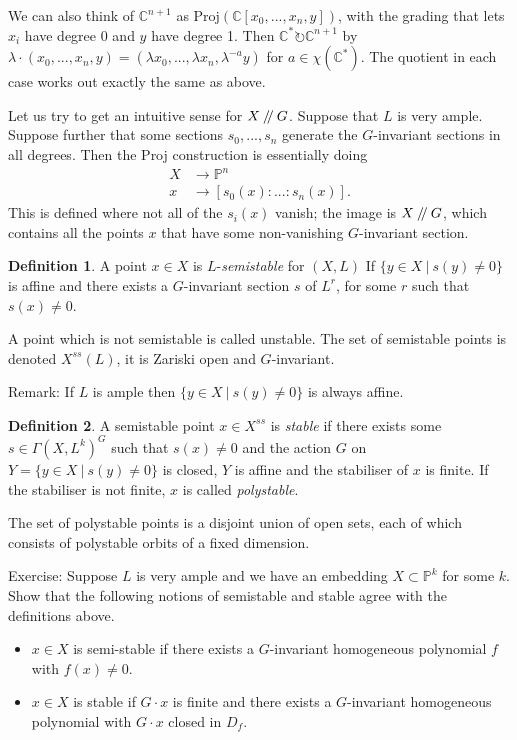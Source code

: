 \documentclass{article}
\theoremstyle{definition}
\newtheorem{defn}{Definition}
\newcommand{\C}{\mathbb{C}}
\newcommand{\bP}{\mathbb{P}}
\newcommand{\sslash}{\mathbin{/\mkern-4mu/}}
\newcommand{\Proj}{\text{Proj}}
\begin{document}
	We can also think of $\C^{n+1}$ as $\Proj\left(\C[x_0,...,x_n,y]\right)$, with the grading that lets $x_i$ have degree 0 and $y$ have degree 1. Then $\C^\ast \circlearrowright \C^{n+1}$ by $\lambda\cdot (x_0,...,x_n,y) = (\lambda x_0,...,\lambda x_n, \lambda^{-a}y)$ for $a\in \chi(\C^\ast)$. The quotient in each case works out exactly the same as above. \vspace{1em}
	
	Let us try to get an intuitive sense for $X\sslash G$. Suppose that $L$ is very ample. Suppose further that some sections $s_0,...,s_n$ generate the $G$-invariant sections in all degrees. Then the Proj construction is essentially doing
	\begin{align*}
		X &\to \bP^n\\
		x&\to [s_0(x):...:s_n(x)].
	\end{align*}
	This is defined where not all of the $s_i(x)$ vanish; the image is $X\sslash G$, which contains all the points $x$ that have some non-vanishing $G$-invariant section.
	
	\begin{defn}
		A point $x\in X$ is $L$-\emph{semistable} for $(X,L)$ If $\{y\in X ~|~ s(y)\neq 0\}$ is affine and there exists a $G$-invariant section $s$ of $L^r$, for some $r$ such that $s(x)\neq0$. \vspace{1em}
		
		A point which is not semistable is called unstable. The set of semistable points is denoted $X^{ss}(L)$, it is Zariski open and $G$-invariant.
	\end{defn}
	Remark: If $L$ is ample then $\{y\in X ~|~ s(y)\neq 0\}$ is always affine. \vspace{1em}
	
	\begin{defn}
		A semistable point $x\in X^{ss}$ is \emph{stable} if there exists some $s\in\Gamma(X,L^k)^G$ such that $s(x)\neq 0$ and the action $G$ on $Y=\{y\in X ~|~ s(y)\neq 0\}$ is closed, $Y$ is affine and the stabiliser of $x$ is finite. If the stabiliser is not finite, $x$ is called \emph{polystable}.
	\end{defn}
	
	The set of polystable points is a disjoint union of open sets, each of which consists of polystable orbits of a fixed dimension. \vspace{1em}
	
	Exercise: Suppose $L$ is very ample and we have an embedding $X\subset \bP^k$ for some $k$. Show that the following notions of semistable and stable agree with the definitions above.
	\begin{itemize}
		\item $x \in X$ is semi-stable if there exists a $G$-invariant homogeneous polynomial $f$ with $f(x)\neq0$.
		\item $x\in X$ is stable if $G\cdot x$ is finite and there exists a $G$-invariant homogeneous polynomial with $G\cdot x$ closed in $D_f$.
	\end{itemize}
	
\end{document}
